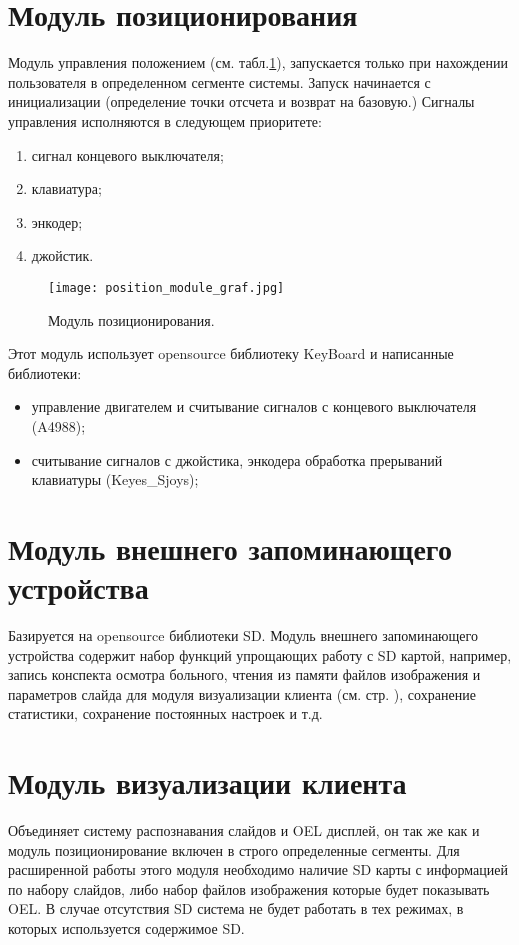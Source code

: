 \section{Модуль позиционирования}

Модуль управления положением (см. табл.\ref{graf:PositionM}), запускается только при нахождении пользователя в определенном сегменте системы. Запуск начинается с инициализации (определение точки отсчета и возврат на базовую.) Сигналы управления исполняются в следующем приоритете:
\begin{enumerate}
\item сигнал концевого выключателя;
\item клавиатура;
\item энкодер;
\item джойстик.
\end{enumerate}


\begin{figure}[ht]
	\centering
     \texttt{[image: position\_module\_graf.jpg]}
	\caption{Модуль позиционирования.}
	\label{graf:PositionM}
\end{figure}

Этот модуль использует opensource библиотеку KeyBoard и написанные библиотеки:
\begin{itemize}
\item управление двигателем и считывание сигналов с концевого выключателя (A4988);
\item считывание сигналов с джойстика, энкодера обработка прерываний клавиатуры (Keyes\_Sjoys);
\end{itemize}

\section{Модуль внешнего запоминающего устройства}

Базируется на opensource библиотеки SD. Модуль внешнего запоминающего устройства содержит набор функций упрощающих работу с SD картой, например, запись конспекта осмотра больного, чтения из памяти файлов изображения и параметров слайда для модуля визуализации клиента (см. стр. \pageref{page:clientvisialmodule}), сохранение статистики, сохранение постоянных настроек и т.д.


\section{Модуль визуализации клиента}
\label{page:clientvisialmodule} 
Объединяет систему распознавания слайдов и OEL дисплей, он так же как и модуль позиционирование включен в строго определенные сегменты. Для расширенной работы этого модуля необходимо наличие SD карты с информацией по набору слайдов, либо набор файлов изображения которые будет показывать OEL. В случае отсутствия SD система не будет работать в тех режимах, в которых используется содержимое SD.


